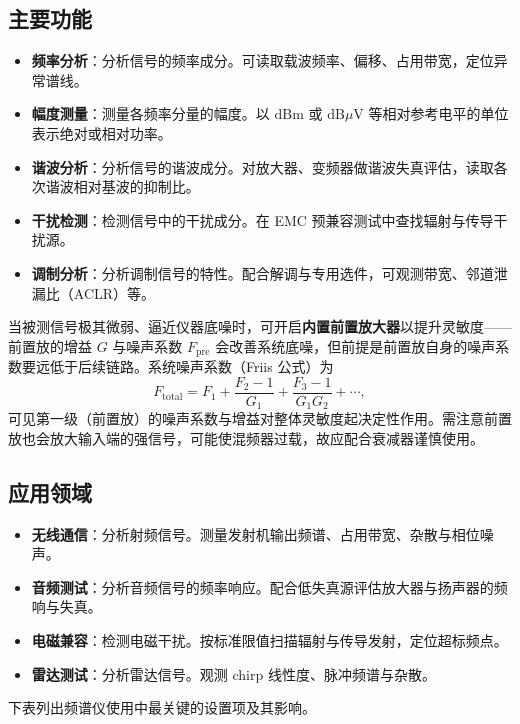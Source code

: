 \subsection{主要功能}

\begin{itemize}
    \item \textbf{频率分析}：分析信号的频率成分。可读取载波频率、偏移、占用带宽，定位异常谱线。
    \item \textbf{幅度测量}：测量各频率分量的幅度。以 $\mathrm{dBm}$ 或 $\mathrm{dB}\mu\mathrm{V}$ 等相对参考电平的单位表示绝对或相对功率。
    \item \textbf{谐波分析}：分析信号的谐波成分。对放大器、变频器做谐波失真评估，读取各次谐波相对基波的抑制比。
    \item \textbf{干扰检测}：检测信号中的干扰成分。在 EMC 预兼容测试中查找辐射与传导干扰源。
    \item \textbf{调制分析}：分析调制信号的特性。配合解调与专用选件，可观测带宽、邻道泄漏比（ACLR）等。
\end{itemize}

当被测信号极其微弱、逼近仪器底噪时，可开启\textbf{内置前置放大器}以提升灵敏度——前置放的增益 $G$ 与噪声系数 $F_{\mathrm{pre}}$ 会改善系统底噪，但前提是前置放自身的噪声系数要远低于后续链路。系统噪声系数（Friis 公式）为
\[
    F_{\mathrm{total}} = F_1 + \frac{F_2-1}{G_1} + \frac{F_3-1}{G_1 G_2} + \cdots ,
\]
可见第一级（前置放）的噪声系数与增益对整体灵敏度起决定性作用。需注意前置放也会放大输入端的强信号，可能使混频器过载，故应配合衰减器谨慎使用。

\subsection{应用领域}

\begin{itemize}
    \item \textbf{无线通信}：分析射频信号。测量发射机输出频谱、占用带宽、杂散与相位噪声。
    \item \textbf{音频测试}：分析音频信号的频率响应。配合低失真源评估放大器与扬声器的频响与失真。
    \item \textbf{电磁兼容}：检测电磁干扰。按标准限值扫描辐射与传导发射，定位超标频点。
    \item \textbf{雷达测试}：分析雷达信号。观测 chirp 线性度、脉冲频谱与杂散。
\end{itemize}

下表列出频谱仪使用中最关键的设置项及其影响。


